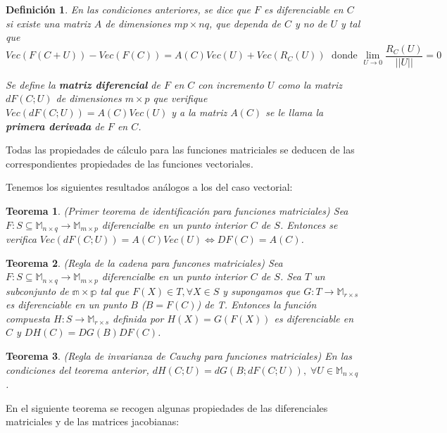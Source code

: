 \documentclass{article}
\theoremstyle{theorem-style}  %
\newtheorem{theorem}{Teorema}[section]  %
\theoremstyle{definition-style}
\newtheorem{definition}{Definición}[section]
\theoremstyle{example-style}
\theoremstyle{exercise-style}
\begin{document}
	\begin{definition}
		\textit{	En las condiciones anteriores, se dice que $F$ es diferenciable en $C$ si existe una matriz $A$ de dimensiones $mp\times nq$, que dependa de $C$ y no de $U$ y tal que}
		$$Vec(F(C+U))-Vec(F(C))=A(C)Vec(U)+Vec(R_C(U))\; \text{ donde } \lim\limits_{U\rightarrow 0} \frac{R_C(U)}{||U||} = 0$$
		
		\textit{Se define la \textbf{matriz diferencial} de $F$ en $C$ con incremento $U$ como la matriz $dF(C;U)$ de dimensiones $m\times p$ que verifique $Vec(dF(C;U))=A(C)Vec(U)$ y a la matriz $A(C)$ se le llama la \textbf{primera derivada} de $F$ en $C$.}
	\end{definition}
	
	Todas las propiedades de cálculo para las funciones matriciales se deducen de las correspondientes propiedades de las funciones vectoriales.
	
	Tenemos los siguientes resultados análogos a los del caso vectorial:
	
	\begin{theorem} (Primer teorema de identificación para funciones matriciales)
		Sea $F:S\subseteq \mathbb{M}_{n \times q}\rightarrow \mathbb{M}_{m \times p}$ diferencialbe en un punto interior $C$ de $S$. Entonces se verifica $Vec(dF(C;U))=A(C)Vec(U) \Leftrightarrow DF(C)=A(C)$.	
	\end{theorem}
	
	\begin{theorem} (Regla de la cadena para funcones matriciales)
		Sea $F:S\subseteq \mathbb{M}_{n \times q}\rightarrow \mathbb{M}_{m \times p}$ diferencialbe en un punto interior $C$ de $S$. Sea $T$ un subconjunto de $\mathbb{m\times p}$ tal que $F(X)\in T, \forall X\in S$ y supongamos que $G:T\rightarrow \mathbb{M}_{r\times s}$ es diferenciable en un punto $B$ ($B=F(C)$) de T. Entonces la función compuesta $H:S\rightarrow \mathbb{M}_{r\times s}$ definida por $H(X)=G(F(X))$ es diferenciable en $C$ y $DH(C)=DG(B)DF(C)$.
	\end{theorem}
	
	\begin{theorem}(Regla de invarianza de Cauchy para funciones matriciales)
		En las condiciones del teorema anterior, $dH(C;U)=dG(B;dF(C;U)), \; \forall U\in \mathbb{M}_{n\times q}$.	
	\end{theorem}
	
	
	
	En el siguiente teorema se recogen algunas propiedades de las diferenciales matriciales y de las matrices jacobianas:
	
\end{document}
